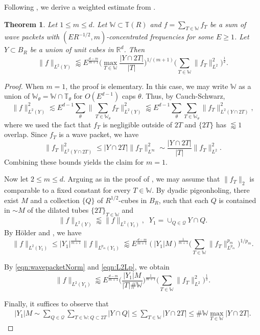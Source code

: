 \documentclass[11pt]{amsart}
\newtheorem{theorem}{Theorem}[section]
\theoremstyle{definition}
\theoremstyle{remark}
\numberwithin{equation}{section}
\newcommand{\R}{\mathbb{R}}
\newcommand{\Q}{\mathcal{Q}}
\newcommand{\W}{\mathbb{W}}
\newcommand{\T}{\mathbb{T}}
\newcommand{\les}{\lesssim}
\newcommand{\less}{\lessapprox}
\begin{document}
Following  \cite{GIOW, du2023weighted,  KimWeightedDec}, we derive a weighted estimate from .
\begin{theorem}\label{thm:b}
Let	$1\leq m \leq d$. 	Let $\W \subset \T(R)$ and $f= \sum_{T\in \W} f_T$ be a sum of wave packets with $(ER^{-1/2},m)$-concentrated frequencies for some $E\geq 1$. Let $Y\subset B_R$ be a union of unit cubes in $\R^d$. Then
	\[  \| f\|_{L^2(Y)}  \less E^{\frac{d-m}{m+1}} \Big( \max_{T\in \W} \frac{|Y\cap 2T|}{|T|} \Big)^{1/(m+1)} \Big( \sum_{T\in \W} \| f_T \|_{L^{2}}^{2} \Big)^{\frac{1}{2}}.\]
\end{theorem}
\begin{proof}
When $m=1$, the proof is elementary. In this case, we may write $\W$ as a union of $\W_\theta= \W \cap \T_\theta$ for $O(E^{d-1})$ caps $\theta$. Thus, by Cauch-Schwarz, 
\[ \| f\|_{L^2(Y)}^2 \les E^{d-1} \sum_{\theta} \| \sum_{T\in \W_\theta} f_T \|_{L^2(Y)}^2 \less E^{d-1}    \sum_{\theta}  \sum_{T\in \W_\theta} \|f_T \|_{L^2(Y\cap 2T)}^2, \]
where we used the fact that $f_T$ is negligible outside of $2T$ and $\{2T\}$ has $\less 1$ overlap. Since $f_T$ is a wave packet, we have 
\[ \| f_T \|_{L^2(Y\cap 2T)}^2 \leq  | Y\cap 2T| \| f_T \|_{L^\infty}^2 \sim \frac{| Y\cap 2T| }{|T|} \| f_T\|_{L^2}^2. \]
Combining these bounds yields the claim for $m=1$. 

Now let $2\leq m \leq d$. Arguing as in the proof of  , we may assume that $\| f_T \|_2$ is comparable to a fixed constant for every $T\in \W$. By dyadic pigeonholing, there exist $M$ and a collection $\{ Q\}$ of $R^{1/2}$-cubes in $B_R$, such that each $Q$ is contained in $\sim M$ of the dilated tubes $\{ 2T\}_{T\in \W}$ and  
	$$\| f\|_{L^2(Y)} \less  \| f\|_{L^2(Y_1)}, \;\; Y_1 = \cup_{Q\in \mathcal{Q}} Y\cap Q.$$ 
	By H\"{o}lder and  , 
	we have
	\begin{equation}\label{eqn:L2Lp}
		\| f\|_{L^2(Y_1)} \leq |Y_1|^{\frac{1}{m+1}} \| f\|_{L^{p_m}(Y_1)}\less E^{\frac{d-m}{m+1}} (|Y_1|M)^{\frac{1}{m+1}} \Big( \sum_{T\in \W} \| f_T \|_{L^{p_m}}^{p_m} \Big)^{1/p_m}. 
	\end{equation}
	
	By \eqref{eqn:wavepacketNorm} and \eqref{eqn:L2Lp}, we obtain
	\begin{equation}\label{eqn:L2weighted}
		\| f\|_{L^2(Y_1)} \less E^{\frac{d-m}{m+1}} \Big(\frac{|Y_1|M}{|T|\# \W}\Big)^{\frac{1}{m+1}} \Big( \sum_{T\in \W} \| f_T \|_{L^{2}}^{2} \Big)^{\frac{1}{2}}.
	\end{equation}
	
	Finally, it suffices to observe that 
	\begin{align*}
		|Y_1| M  \sim  \sum_{Q\in \Q} \sum_{T\in \W: Q \subset 2T} |Y\cap Q|   \leq \sum_{T\in \W} |Y\cap 2T| \leq \# \W \max_{T\in \W} |Y\cap 2T|.
	\end{align*}
\end{proof}
\end{document}
